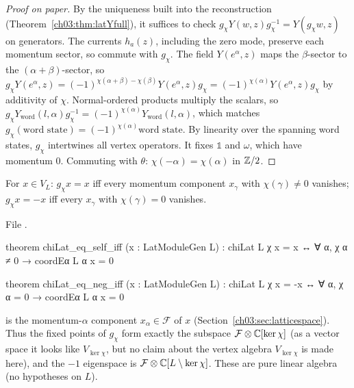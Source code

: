 \begin{proof}[Proof on paper]
By the uniqueness built into the reconstruction (Theorem~\ref{ch03:thm:latYfull}), it suffices to
check $g_\chi Y(w,z)g_\chi^{-1}=Y(g_\chi w,z)$ on generators. The currents $h_a(z)$, including the
zero mode, preserve each momentum sector, so commute with $g_\chi$. The field $Y(e^\alpha,z)$
maps the $\beta$-sector to the $(\alpha+\beta)$-sector, so
$g_\chi Y(e^\alpha,z)=(-1)^{\chi(\alpha+\beta)-\chi(\beta)}Y(e^\alpha,z)g_\chi=(-1)^{\chi(\alpha)}
Y(e^\alpha,z)g_\chi$ by additivity of $\chi$. Normal-ordered products multiply the scalars, so
$g_\chi Y_{\mathrm{word}}(l,\alpha)g_\chi^{-1}=(-1)^{\chi(\alpha)}Y_{\mathrm{word}}(l,\alpha)$,
which matches $g_\chi(\text{word state})=(-1)^{\chi(\alpha)}\text{word state}$. By linearity over
the spanning word states, $g_\chi$ intertwines all vertex operators. It fixes $\mathbb 1$ and
$\omega$, which have momentum $0$. Commuting with $\theta$: $\chi(-\alpha)=\chi(\alpha)$ in ${\mathbb{Z}}/2$.
\end{proof}

\begin{theorem}\label{ch03:thm:chieig}
For $x\in V_L$: $g_\chi x=x$ iff every momentum component $x_\gamma$ with $\chi(\gamma)\ne0$
vanishes; $g_\chi x=-x$ iff every $x_\gamma$ with $\chi(\gamma)=0$ vanishes.
\end{theorem}
\noindent File .
\begin{leancode}
theorem chiLat_eq_self_iff (x : LatModuleGen L) :
    chiLat L χ x = x ↔ ∀ α, χ α ≠ 0 → coordEα L α x = 0

theorem chiLat_eq_neg_iff (x : LatModuleGen L) :
    chiLat L χ x = -x ↔ ∀ α, χ α = 0 → coordEα L α x = 0
\end{leancode}
\begin{dictionary}
 is the momentum-$\alpha$ component $x_\alpha\in\mathcal F$ of $x$
(Section~\ref{ch03:sec:latticespace}). Thus the fixed points of $g_\chi$ form exactly the
subspace $\mathcal F\otimes{\mathbb{C}}[\ker\chi]$ (as a vector space it looks like $V_{\ker\chi}$, but no
claim about the vertex algebra $V_{\ker\chi}$ is made here), and the $-1$ eigenspace is
$\mathcal F\otimes{\mathbb{C}}[L\setminus\ker\chi]$. These are pure linear algebra (no hypotheses on $L$).
\end{dictionary}

